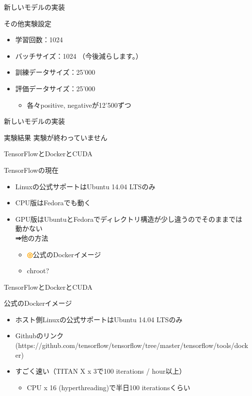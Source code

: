 \documentclass[aspectratio=43,unicode,10pt]{beamer}
\newcommand{\then}{\textcolor{ttiblue}{\textbf{⇒}}\hspace{1ex}}
\newcommand{\good}{\textcolor{orange}{\textbf{◎}}\hspace{1ex}}
\begin{document}
\begin{frame}{新しいモデルの実装}
  \begin{block}{その他実験設定}
    \begin{itemize}
      \item 学習回数：1024
      \item バッチサイズ：1024 （今後減らします。）
      \item 訓練データサイズ：25'000
      \item 評価データサイズ：25'000
        \begin{itemize}
          \item 各々positive, negativeが12'500ずつ
        \end{itemize}
    \end{itemize}
  \end{block}
\end{frame}

\begin{frame}{新しいモデルの実装}
  \begin{block}{実験結果}
    実験が終わっていません
  \end{block}
\end{frame}

\begin{frame}{TensorFlowとDockerとCUDA}
  \begin{block}{TensorFlowの現在}
    \begin{itemize}
      \item Linuxの公式サポートはUbuntu 14.04 LTSのみ
      \item CPU版はFedoraでも動く
      \item GPU版はUbuntuとFedoraでディレクトリ構造が少し違うのでそのままでは
            動かない \\
            \then 他の方法
        \begin{itemize}
          \item \good 公式のDockerイメージ
          \item chroot?
        \end{itemize}
    \end{itemize}
  \end{block}
\end{frame}

\begin{frame}{TensorFlowとDockerとCUDA}
  \begin{block}{公式のDockerイメージ}
    \begin{itemize}
      \item ホスト側Linuxの公式サポートはUbuntu 14.04 LTSのみ
      \item Githubのリンク (https://github.com/tensorflow/tensorflow/tree/master/tensorflow/tools/docker)
      \item すごく速い（TITAN X x 3で100 iterations / hour以上）
        \begin{itemize}
          \item CPU x 16 (hyperthreading)で半日100 iterationsくらい
        \end{itemize}
    \end{itemize}
  \end{block}
\end{frame}
\end{document}
